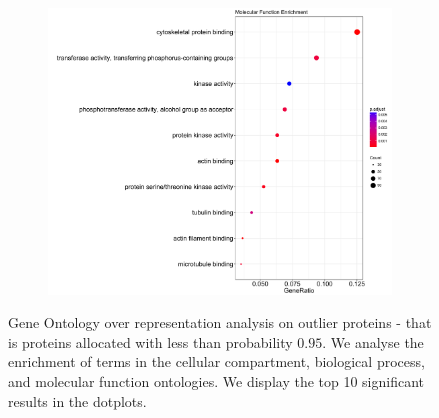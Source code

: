 \documentclass[12pt,english]{article}\usepackage[]{graphicx}\usepackage[]{color}
\begin{document}
\begin{figure}[h]
  \begin{subfigure}[t]{0.5\textwidth}
    \centering
    \includegraphics[width=\textwidth]{MFenrich.pdf}
  \end{subfigure}
  \caption{Gene Ontology over representation analysis on outlier
    proteins - that is proteins allocated with less than probability
    $0.95$. We analyse the enrichment of terms in the cellular
    compartment, biological process, and molecular function
    ontologies. We display the top 10 significant results in the
    dotplots.}
  \label{fig:GOenrich}
\end{figure}


\clearpage



\end{document}
